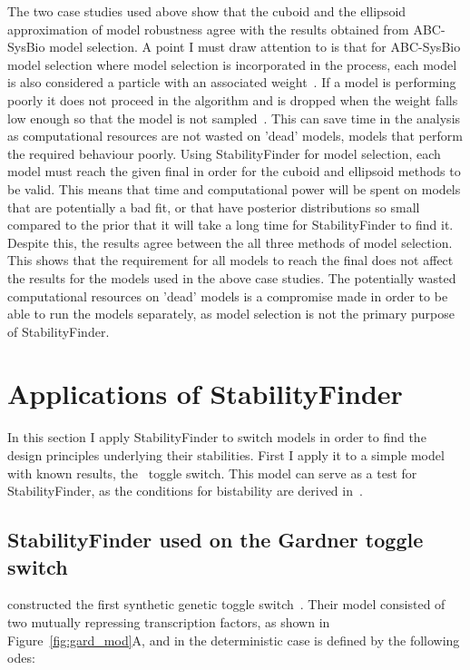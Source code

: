 The two case studies used above show that the cuboid and the ellipsoid approximation of model robustness agree with the results obtained from ABC-SysBio model selection. A point I must draw attention to is that for ABC-SysBio model selection where model selection is incorporated in the process, each model is also considered a particle with an associated weight~\autocite{Toni:2009tr}. If a model is performing poorly it does not proceed in the algorithm and is dropped when the weight falls low enough so that the model is not sampled~\autocite{Toni:2009tr}. This can save time in the analysis as computational resources are not wasted on 'dead' models, models that perform the required behaviour poorly. Using StabilityFinder for model selection, each model must reach the given final \textepsilon{} in order for the cuboid and ellipsoid methods to be valid. This means that time and computational power will be spent on models that are potentially a bad fit, or that have posterior distributions so small compared to the prior that it will take a long time for StabilityFinder to find it. Despite this, the results agree between the all three methods of model selection. This shows that the requirement for all models to reach the final \textepsilon{} does not affect the results for the models used in the above case studies. The potentially wasted computational resources on 'dead' models is a compromise made in order to be able to run the models separately, as model selection is not the primary purpose of StabilityFinder. 

\section{Applications of StabilityFinder}

In this section I apply StabilityFinder to switch models in order to find the design principles underlying their stabilities. First I apply it to a simple model with known results, the~\textcite{Gardner:2000vha} toggle switch. This model can serve as a test for StabilityFinder, as the conditions for bistability are derived in~\textcite{Gardner:2000vha}.


\subsection{StabilityFinder used on the Gardner toggle switch}
\label{sec:gard}
\textcite{Gardner:2000vha} constructed the first synthetic genetic toggle switch~\autocite{Gardner:2000vha}. Their model consisted of two mutually repressing transcription factors, as shown in Figure~\ref{fig:gard_mod}A, and in the deterministic case is defined by the following \acrshort{ode}s:

